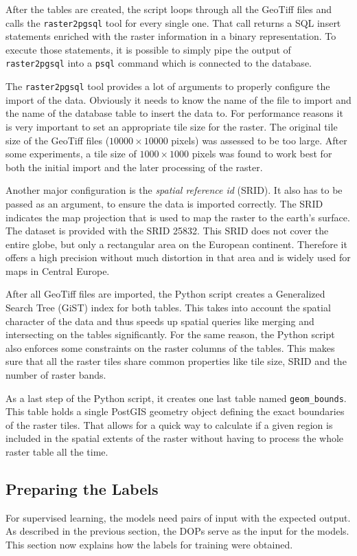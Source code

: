 After the tables are created, the script loops through all the GeoTiff files and calls the \texttt{raster2pgsql} tool for every single one. That call returns a SQL insert statements enriched with the raster information in a binary representation. To execute those statements, it is possible to simply pipe the output of \texttt{raster2pgsql} into a \texttt{psql} command which is connected to the database.

The \texttt{raster2pgsql} tool provides a lot of arguments to properly configure the import of the data. Obviously it needs to know the name of the file to import and the name of the database table to insert the data to. For performance reasons it is very important to set an appropriate tile size for the raster. The original tile size of the GeoTiff files ($10000\times 10000$ pixels) was assessed to be too large. After some experiments, a tile size of $1000\times 1000$ pixels was found to work best for both the initial import and the later processing of the raster.

Another major configuration is the \emph{spatial reference id} (SRID). It also has to be passed as an argument, to ensure the data is imported correctly. The SRID indicates the map projection that is used to map the raster to the earth's surface. The dataset is provided with the SRID 25832. This SRID does not cover the entire globe, but only a rectangular area on the European continent. Therefore it offers a high precision without much distortion in that area and is widely used for maps in Central Europe.

After all GeoTiff files are imported, the Python script creates a Generalized Search Tree (GiST) index for both tables. This takes into account the spatial character of the data and thus speeds up spatial queries like merging and intersecting on the tables significantly. For the same reason, the Python script also enforces some constraints on the raster columns of the tables. This makes sure that all the raster tiles share common properties like tile size, SRID and the number of raster bands.

As a last step of the Python script, it creates one last table named \texttt{geom\_bounds}. This table holds a single PostGIS geometry object defining the exact boundaries of the raster tiles. That allows for a quick way to calculate if a given region is included in the spatial extents of the raster without having to process the whole raster table all the time.

\subsection{Preparing the Labels}
\label{sec:prepare_labels}
For supervised learning, the models need pairs of input with the expected output. As described in the previous section, the DOPs serve as the input for the models. This section now explains how the labels for training were obtained.

